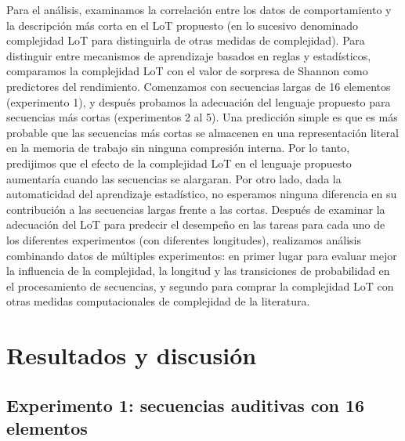 Para el análisis, examinamos la correlación entre los datos de comportamiento y la descripción más corta en el LoT propuesto (en lo sucesivo denominado complejidad LoT para distinguirla de otras medidas de complejidad). Para distinguir entre mecanismos de aprendizaje basados en reglas y estadísticos, comparamos la complejidad LoT con el valor de sorpresa de Shannon como predictores del rendimiento. Comenzamos con secuencias largas de 16 elementos (experimento 1), y después probamos la adecuación del lenguaje propuesto para secuencias más cortas (experimentos 2 al 5). Una predicción simple es que es más probable que las secuencias más cortas se almacenen en una representación literal en la memoria de trabajo sin ninguna compresión interna. Por lo tanto, predijimos que el efecto de la complejidad LoT en el lenguaje propuesto aumentaría cuando las secuencias se alargaran. Por otro lado, dada la automaticidad del aprendizaje estadístico, no esperamos ninguna diferencia en su contribución a las secuencias largas frente a las cortas. Después de examinar la adecuación del LoT para predecir el desempeño en las tareas para cada uno de los diferentes experimentos (con diferentes longitudes), realizamos análisis combinando datos de múltiples experimentos: en primer lugar para evaluar mejor la influencia de la complejidad, la longitud y las transiciones de probabilidad en el procesamiento de secuencias, y segundo para comprar la complejidad LoT con otras medidas computacionales de complejidad de la literatura. 

\section{Resultados y discusión}

\subsection{Experimento 1: secuencias auditivas con 16 elementos}

